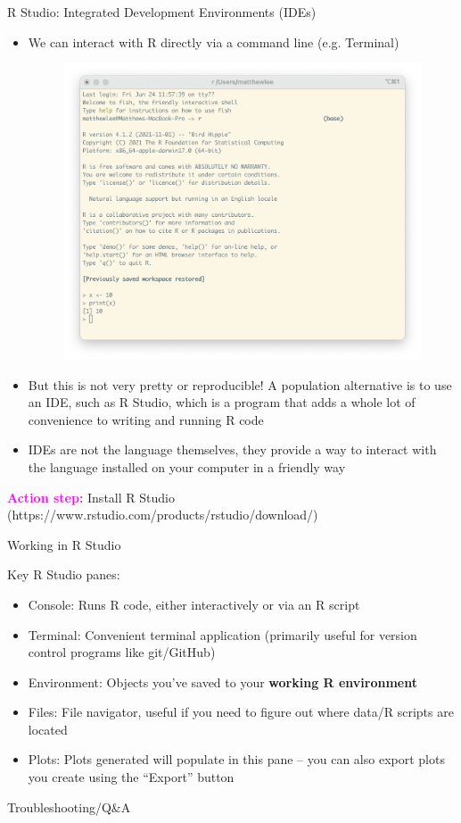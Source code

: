 \documentclass[svgnames,smaller]{beamer}\usepackage[]{graphicx}\usepackage[]{color}
\newcommand{\bmagenta}[1]{\textcolor{magenta}{\textbf{#1}}}
\begin{document}
\begin{frame}{R Studio: Integrated Development Environments (IDEs)}

\begin{itemize}
    \item We can interact with R directly via a command line (e.g. Terminal)
    \begin{figure}[tb]
    \centering
    \includegraphics[width = .35\textwidth]{R-terminal.png}
    \end{figure}
    \item But this is not very pretty or reproducible! A population alternative is to use an IDE, such as R Studio, which is a program that adds a whole lot of convenience to writing and running R code
    \item IDEs are not the language themselves, they provide a way to interact with the language installed on your computer in a friendly way
\end{itemize}

\bmagenta{Action step:} Install R Studio (https://www.rstudio.com/products/rstudio/download/) 


\end{frame}



\begin{frame}{Working in R Studio}

Key R Studio panes:
\begin{itemize}
    \item Console: Runs R code, either interactively or via an R script
    \item Terminal: Convenient terminal application (primarily useful for version control programs like git/GitHub)
    \item Environment: Objects you've saved to your \textbf{working R environment}
    \item Files: File navigator, useful if you need to figure out where data/R scripts are located
    \item Plots: Plots generated will populate in this pane -- you can also export plots you create using the ``Export'' button
\end{itemize}



\end{frame}



\begin{frame}{Troubleshooting/Q\&A}



\end{frame}
\end{document}
